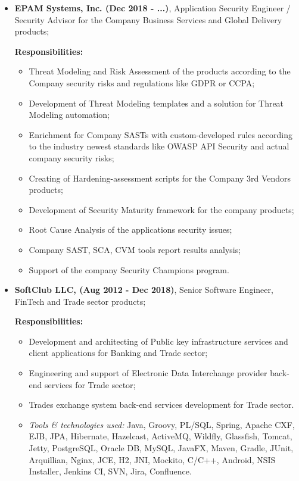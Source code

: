 \documentclass[a4paper, 12pt]{article}
\newcommand{\position}[1]{
    \textbf{#1}}
\newcommand{\itemlabel}[1]{
    \textit{#1:}}
\begin{document}
    \begin{itemize}
        \item \position{EPAM Systems, Inc. (Dec 2018 - ...)}, Application Security Engineer / Security Advisor for the Company Business Services and Global Delivery products;

            \textbf{Responsibilities:}
			\begin{itemize}
  				\item Threat Modeling and Risk Assessment of the products according to the Company security risks and regulations like GDPR or CCPA;
  				\item Development of Threat Modeling templates and a solution for Threat Modeling automation;
  				\item Enrichment for Company SASTs with custom-developed rules according to the industry newest standards like OWASP API Security and actual company security risks;
				\item Creating of Hardening-assessment scripts for the Company 3rd Vendors products;
  				\item Development of Security Maturity framework for the company products;
  				\item Root Cause Analysis of the applications security issues;
  				\item Company SAST, SCA, CVM tools report results analysis;
  				\item Support of the company Security Champions program.
			\end{itemize}
    \end{itemize} 
            
    \begin{itemize}
        \item \position{SoftClub LLC, (Aug 2012 - Dec 2018)}, Senior Software Engineer, FinTech and Trade sector products;

            \textbf{Responsibilities:}
			\begin{itemize}
  				\item Development and architecting of Public key infrastructure services and client applications for Banking and Trade sector;
  				\item Engineering and support of Electronic Data Interchange provider back-end services for Trade sector;
				\item Trades exchange system back-end services development for Trade sector.
			\end{itemize}
	
            \begin{itemize}
                \item \itemlabel{Tools \& technologies used} Java, Groovy, PL/SQL, Spring, Apache CXF, EJB, JPA, Hibernate, Hazelcast, ActiveMQ, Wildfly, Glassfish, Tomcat, Jetty, PostgreSQL, Oracle DB, MySQL, JavaFX, Maven, Gradle, JUnit, Arquillian, Nginx, JCE, H2, JNI, Mockito, C/C++, Android, NSIS Installer, Jenkins CI, SVN, Jira, Confluence.
            \end{itemize}
    \end{itemize}
\end{document}
